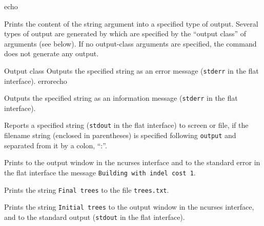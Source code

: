 \begin{command}{echo}{}

	
	\begin{poydescription} 
         Prints the content of the string argument into a specified type of output.
         Several types of output are generated by \poy  which are specified by the
         ``output class'' of arguments (see below). If no output-class arguments are
         specified, the command does not generate any output.
	\end{poydescription}

    \begin{arguments}
           \begin{argumentgroup}{Output class}
            {Outputs the specified string as an error message (\texttt{stderr} in the
            flat interface).}
            {errorecho}

            {Outputs the specified string as an information message (\texttt{stderr} in the
            flat interface).}
            {}

            {Reports a specified string (\texttt{stdout} in the flat interface) to screen or file, 
            if the filename string (enclosed in parentheses) is specified following \texttt{output} 
            and separated from it by a colon, ``:''.}
            {}
           \end{argumentgroup}
    \end{arguments}

	\begin{poyexamples}

            {Prints to the output window in the ncurses interface and to the
            standard error in the flat interface the message \texttt
{Building with indel cost 1}.}

            {Prints the string \texttt{Final trees} to the file \texttt{trees.txt}.}

            {Prints the string \texttt{Initial trees} to the output window in the
            ncurses interface, and to the standard output (\texttt{stdout} in the flat
            interface).}
    \end{poyexamples}

	\begin{poyalso}
	\end{poyalso}

\end{command}

